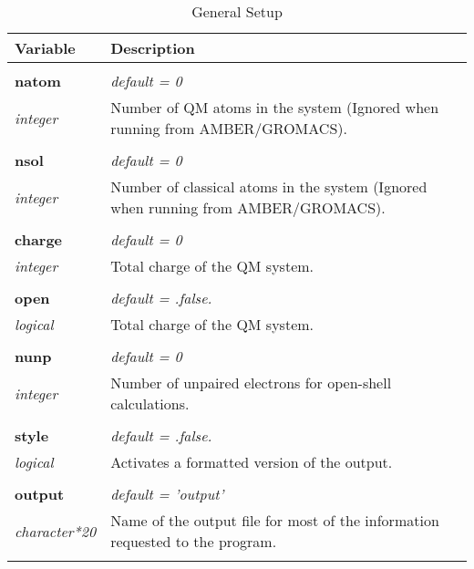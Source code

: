 \begin{Spacing}{1.0}
\begin{longtable}{ p{} p{} }

   \toprule
   \textbf{Variable} & Description \\*
   \midrule \\*
   \endhead

   \bottomrule
   \caption{General Setup}
   \endfoot

   \textbf{natom}
   &  \textit{default = 0 }
   \\*\textit{integer}
   & Number of QM atoms in the system (Ignored when
   running from AMBER/GROMACS).\\* \\

   \textbf{nsol}
   &  \textit{default = 0 }
   \\*\textit{integer}
   & Number of classical atoms in the system (Ignored
   when running from AMBER/GROMACS).\\* \\

   \textbf{charge}
   &  \textit{default = 0 }
   \\*\textit{integer}
   & Total charge of the QM system.\\* \\

   \textbf{open}
   &  \textit{default = .false. }
   \\*\textit{logical}
   & Total charge of the QM system.\\* \\

   \textbf{nunp}
   &  \textit{default = 0 }
   \\*\textit{integer}
   & Number of unpaired electrons for open-shell
   calculations.\\* \\

   \textbf{style}
   &  \textit{default = .false. }
   \\*\textit{logical}
   & Activates a formatted version of the output.\\* \\

   \textbf{output}
   &  \textit{default = 'output' }
   \\*\textit{character*20}
   & Name of the output file for most of the information
   requested to the program.\\* \\


\end{longtable}
\end{Spacing}

